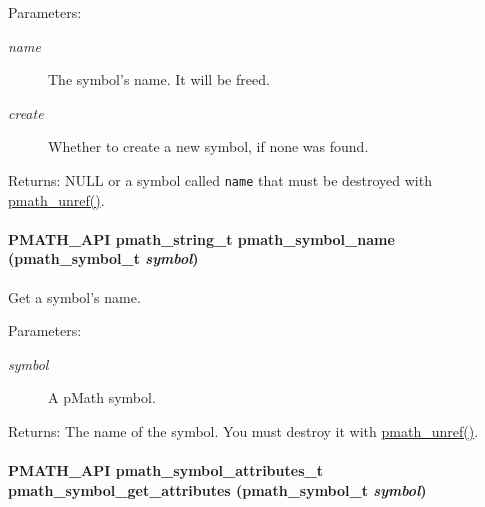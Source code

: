 \begin{Desc}
\item[Parameters:]
\begin{description}
\item[{\em name}]The symbol's name. It will be freed. \item[{\em create}]Whether to create a new symbol, if none was found. \end{description}
\end{Desc}
\begin{Desc}
\item[Returns:]NULL or a symbol called {\tt name} that must be destroyed with \hyperlink{classpmath__t_54e905402c38940687033b87eb8c6c9f}{pmath\_\-unref()}. \end{Desc}
\hypertarget{group__symbols_g286ea4e54b4bf2922c519ec5b823bf41}{
\paragraph[{pmath\_\-symbol\_\-name}]{\setlength{\rightskip}{0pt plus 5cm}PMATH\_\-API {\bf pmath\_\-string\_\-t} pmath\_\-symbol\_\-name ({\bf pmath\_\-symbol\_\-t} {\em symbol})}\hfill}
\label{group__symbols_g286ea4e54b4bf2922c519ec5b823bf41}


Get a symbol's name. 

\begin{Desc}
\item[Parameters:]
\begin{description}
\item[{\em symbol}]A pMath symbol. \end{description}
\end{Desc}
\begin{Desc}
\item[Returns:]The name of the symbol. You must destroy it with \hyperlink{classpmath__t_54e905402c38940687033b87eb8c6c9f}{pmath\_\-unref()}. \end{Desc}
\hypertarget{group__symbols_gd553b66226a31e4c105b4f3c93682284}{
\paragraph[{pmath\_\-symbol\_\-get\_\-attributes}]{\setlength{\rightskip}{0pt plus 5cm}PMATH\_\-API {\bf pmath\_\-symbol\_\-attributes\_\-t} pmath\_\-symbol\_\-get\_\-attributes ({\bf pmath\_\-symbol\_\-t} {\em symbol})}\hfill}
\label{group__symbols_gd553b66226a31e4c105b4f3c93682284}


